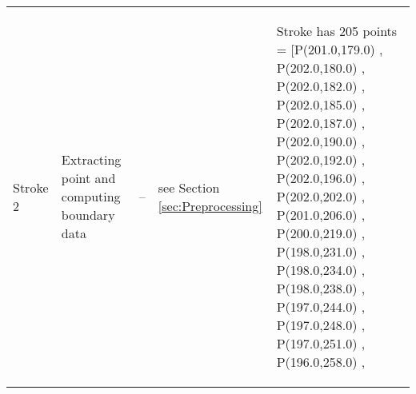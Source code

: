 \begin{landscape}
\begin{scriptsize}
\begin{longtable}{|p{2cm}|p{2cm}|p{2cm}|p{2cm}|p{13cm}|}
Stroke 2 & Extracting point and computing boundary data & -- &  see Section \ref{sec:Preprocessing} &
\begin{scriptsize}
Stroke has 205 points = [P(201.0,179.0) , P(202.0,180.0) , P(202.0,182.0) , P(202.0,185.0) , P(202.0,187.0) , P(202.0,190.0) , P(202.0,192.0) , P(202.0,196.0) , P(202.0,202.0) , P(201.0,206.0) , P(200.0,219.0) , P(198.0,231.0) , P(198.0,234.0) , P(198.0,238.0) , P(197.0,244.0) , P(197.0,248.0) , P(197.0,251.0) , P(196.0,258.0) , %

\end{scriptsize}
\end{longtable}
\end{scriptsize}
\end{landscape}
